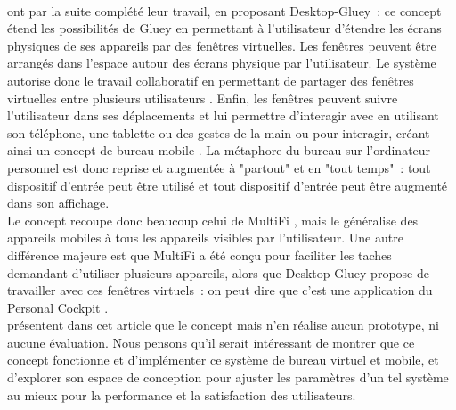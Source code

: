 
\paragraph*{}
\citet{SerranoEnsYangEtAl2015b} ont par la suite complété leur travail, en proposant Desktop-Gluey~: ce concept étend les possibilités de Gluey en permettant à l'utilisateur d'étendre les écrans physiques de ses appareils par des fenêtres virtuelles. Les fenêtres peuvent être arrangés dans l'espace autour des écrans physique par l'utilisateur. Le système autorise donc le travail collaboratif en permettant de partager des fenêtres virtuelles entre plusieurs utilisateurs . Enfin, les fenêtres peuvent suivre l'utilisateur dans ses déplacements et lui permettre d'interagir avec en utilisant son téléphone, une tablette ou des gestes de la main ou pour interagir, créant ainsi un concept de bureau mobile . La métaphore du bureau sur l'ordinateur personnel est donc reprise et augmentée à "partout" et en "tout temps"~: tout dispositif d'entrée peut être utilisé et tout dispositif d'entrée peut être augmenté dans son affichage.\\
Le concept recoupe donc beaucoup celui de MultiFi \citep{GrubertHeinischQuigleyEtAl2015}, mais le généralise des appareils mobiles à tous les appareils visibles par l'utilisateur. Une autre différence majeure est que MultiFi a été conçu pour faciliter les taches demandant d'utiliser plusieurs appareils, alors que Desktop-Gluey propose de travailler avec ces fenêtres virtuels~: on peut dire que c'est une application du Personal Cockpit \citep{EnsFinneganIrani2014}.\\
\citeauthor{SerranoEnsYangEtAl2015b} présentent dans cet article que le concept mais n'en réalise aucun prototype, ni aucune évaluation. Nous pensons qu'il serait intéressant de montrer que ce concept fonctionne et d'implémenter ce système de bureau virtuel et mobile, et d'explorer son espace de conception pour ajuster les paramètres d'un tel système au mieux pour la performance et la satisfaction des utilisateurs.


